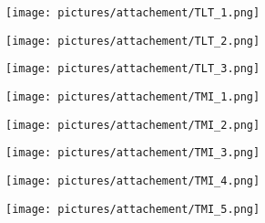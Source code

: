 \begin{figure} \ContinuedFloat
        \centering
        \begin{subfigure}{.49\textwidth}
                \centering
                \texttt{[image: pictures/attachement/TLT\_1.png]}
        \end{subfigure}
        \begin{subfigure}{.49\textwidth}
                \centering
                \texttt{[image: pictures/attachement/TLT\_2.png]}
        \end{subfigure}
\end{figure}
\begin{figure} \ContinuedFloat
        \centering
        \begin{subfigure}{.49\textwidth}
                \centering
                \texttt{[image: pictures/attachement/TLT\_3.png]}
        \end{subfigure}
        \begin{subfigure}{.49\textwidth}
                \centering
                \texttt{[image: pictures/attachement/TMI\_1.png]}
        \end{subfigure}
\end{figure}
\begin{figure} \ContinuedFloat
        \centering
        \begin{subfigure}{.49\textwidth}
                \centering
                \texttt{[image: pictures/attachement/TMI\_2.png]}
        \end{subfigure}
        \begin{subfigure}{.49\textwidth}
                \centering
                \texttt{[image: pictures/attachement/TMI\_3.png]}
        \end{subfigure}
\end{figure}
\begin{figure} \ContinuedFloat
        \centering
        \begin{subfigure}{.49\textwidth}
                \centering
                \texttt{[image: pictures/attachement/TMI\_4.png]}
        \end{subfigure}
        \begin{subfigure}{.49\textwidth}
                \centering
                \texttt{[image: pictures/attachement/TMI\_5.png]}
        \end{subfigure}
\end{figure}
